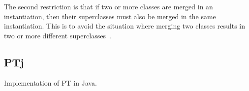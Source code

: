 The second restriction is that if two or more classes are merged in an instantiation, then their superclasses must also be merged in the same instantiation.
This is to avoid the situation where merging two classes results in two or more different superclasses~\cite{jot}.

\subsection{PTj}\label{subsec:ptj}

Implementation of PT in Java.

